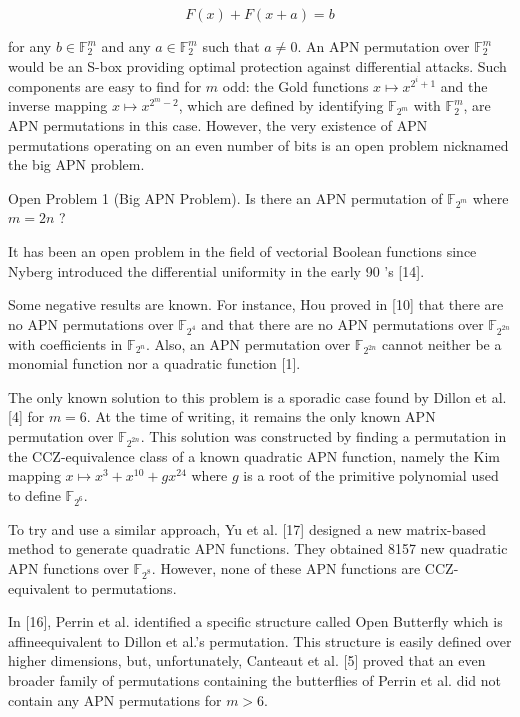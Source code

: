 \documentclass[10pt]{article}
\begin{document}
$$
F(x)+F(x+a)=b
$$

for any $b \in \mathbb{F}_{2}^{m}$ and any $a \in \mathbb{F}_{2}^{m}$ such that $a \neq 0$. An APN permutation over $\mathbb{F}_{2}^{m}$ would be an S-box providing optimal protection against differential attacks. Such components are easy to find for $m$ odd: the Gold functions $x \mapsto x^{2^{i}+1}$ and the inverse mapping $x \mapsto x^{2^{m}-2}$, which are defined by identifying $\mathbb{F}_{2^{m}}$ with $\mathbb{F}_{2}^{m}$, are APN permutations in this case. However, the very existence of APN permutations operating on an even number of bits is an open problem nicknamed the big APN problem.

Open Problem 1 (Big APN Problem). Is there an APN permutation of $\mathbb{F}_{2^{m}}$ where $m=2 n$ ?

It has been an open problem in the field of vectorial Boolean functions since Nyberg introduced the differential uniformity in the early 90 's [14].

Some negative results are known. For instance, Hou proved in [10] that there are no APN permutations over $\mathbb{F}_{2^{4}}$ and that there are no APN permutations over $\mathbb{F}_{2^{2 n}}$ with coefficients in $\mathbb{F}_{2^{n}}$. Also, an APN permutation over $\mathbb{F}_{2^{2 n}}$ cannot neither be a monomial function nor a quadratic function [1].

The only known solution to this problem is a sporadic case found by Dillon et al. [4] for $m=6$. At the time of writing, it remains the only known APN permutation over $\mathbb{F}_{2^{2 n}}$. This solution was constructed by finding a permutation in the CCZ-equivalence class of a known quadratic APN function, namely the Kim mapping $x \mapsto x^{3}+x^{10}+g x^{24}$ where $g$ is a root of the primitive polynomial used to define $\mathbb{F}_{2^{6}}$.

To try and use a similar approach, Yu et al. [17] designed a new matrix-based method to generate quadratic APN functions. They obtained 8157 new quadratic APN functions over $\mathbb{F}_{2^{8}}$. However, none of these APN functions are CCZ-equivalent to permutations.

In [16], Perrin et al. identified a specific structure called Open Butterfly which is affineequivalent to Dillon et al.'s permutation. This structure is easily defined over higher dimensions, but, unfortunately, Canteaut et al. [5] proved that an even broader family of permutations containing the butterflies of Perrin et al. did not contain any APN permutations for $m>6$.
\end{document}
